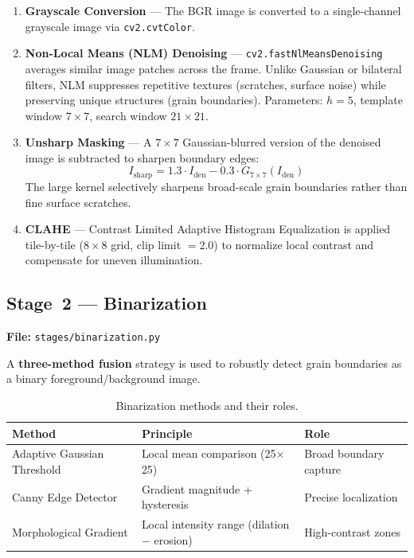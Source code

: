 \documentclass[12pt,a4paper]{article}
\newcommand{\code}[1]{\texttt{#1}}
\newcommand{\file}[1]{\texttt{\small #1}}
\begin{document}
\begin{enumerate}[leftmargin=*]
    \item \textbf{Grayscale Conversion} --- The BGR image is converted to a
          single-channel grayscale image via \code{cv2.cvtColor}.

    \item \textbf{Non-Local Means (NLM) Denoising} ---
          \code{cv2.fastNlMeansDenoising} averages similar image patches
          across the frame. Unlike Gaussian or bilateral filters, NLM
          suppresses repetitive textures (scratches, surface noise) while
          preserving unique structures (grain boundaries). Parameters:
          $h=5$, template window $7\times7$, search window $21\times21$.

    \item \textbf{Unsharp Masking} --- A $7\times7$ Gaussian-blurred version
          of the denoised image is subtracted to sharpen boundary edges:
          \begin{equation}
              I_\mathrm{sharp} = 1.3 \cdot I_\mathrm{den} - 0.3 \cdot G_{7\times7}(I_\mathrm{den})
          \end{equation}
          The large kernel selectively sharpens broad-scale grain boundaries
          rather than fine surface scratches.

    \item \textbf{CLAHE} --- Contrast Limited Adaptive Histogram Equalization
          is applied tile-by-tile ($8\times8$ grid, clip limit $= 2.0$) to
          normalize local contrast and compensate for uneven illumination.
\end{enumerate}

\subsection{Stage~2 --- Binarization}

\textbf{File:} \file{stages/binarization.py}

A \textbf{three-method fusion} strategy is used to robustly detect grain
boundaries as a binary foreground/background image.

\begin{table}[H]
    \centering
    \caption{Binarization methods and their roles.}
    \label{tab:binarization}
    \begin{tabular}{lll}
        \toprule
        \textbf{Method} & \textbf{Principle} & \textbf{Role} \\
        \midrule
        Adaptive Gaussian Threshold & Local mean comparison (25$\times$25) & Broad boundary capture \\
        Canny Edge Detector & Gradient magnitude + hysteresis & Precise localization \\
        Morphological Gradient & Local intensity range (dilation $-$ erosion) & High-contrast zones \\
        \bottomrule
    \end{tabular}
\end{table}
\end{document}
